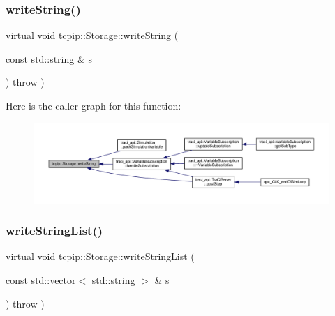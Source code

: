 \subsubsection{\texorpdfstring{write\+String()}{writeString()}}
{\footnotesize\ttfamily virtual void tcpip\+::\+Storage\+::write\+String (\begin{DoxyParamCaption}\item[{const std\+::string \&}]{s }\end{DoxyParamCaption}) throw  ) \hspace{0.3cm}{\ttfamily [virtual]}}

Here is the caller graph for this function\+:
\nopagebreak
\begin{figure}[H]
\begin{center}
\leavevmode
\includegraphics[width=350pt]{classtcpip_1_1_storage_a07b6d4f8db8f1893aa4ed419be5a5d25_icgraph}
\end{center}
\end{figure}
\mbox{\label{classtcpip_1_1_storage_ac1d5d12f930b3884f3265508f2b43901}} 
\subsubsection{\texorpdfstring{write\+String\+List()}{writeStringList()}}
{\footnotesize\ttfamily virtual void tcpip\+::\+Storage\+::write\+String\+List (\begin{DoxyParamCaption}\item[{const std\+::vector$<$ std\+::string $>$ \&}]{s }\end{DoxyParamCaption}) throw  ) \hspace{0.3cm}{\ttfamily [virtual]}}

